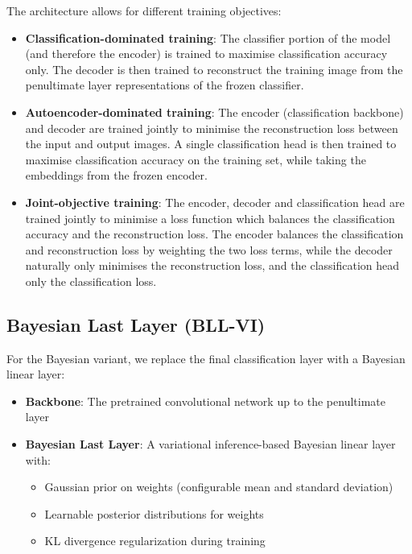 \documentclass{article}
\begin{document}
The architecture allows for different training objectives:
\begin{itemize}
    \item \textbf{Classification-dominated training}: The classifier portion of the model (and therefore the encoder) is trained to maximise classification accuracy only. The decoder is then trained to reconstruct the training image from the penultimate layer representations of the frozen classifier.
    \item \textbf{Autoencoder-dominated training}: The encoder (classification backbone) and decoder are trained jointly to minimise the reconstruction loss between the input and output images. A single classification head is then trained to maximise classification accuracy on the training set, while taking the embeddings from the frozen encoder.
    \item \textbf{Joint-objective training}: The encoder, decoder and classification head are trained jointly to minimise a loss function which balances the classification accuracy and the reconstruction loss. The encoder balances the classification and reconstruction loss by weighting the two loss terms, while the decoder naturally only minimises the reconstruction loss, and the classification head only the classification loss.
\end{itemize}

\subsection{Bayesian Last Layer (BLL-VI)}
For the Bayesian variant, we replace the final classification layer with a Bayesian linear layer:

\begin{itemize}
    \item \textbf{Backbone}: The pretrained convolutional network up to the penultimate layer
    \item \textbf{Bayesian Last Layer}: A variational inference-based Bayesian linear layer with:
    \begin{itemize}
        \item Gaussian prior on weights (configurable mean and standard deviation)
        \item Learnable posterior distributions for weights
        \item KL divergence regularization during training
    \end{itemize}
\end{itemize}
\end{document}
